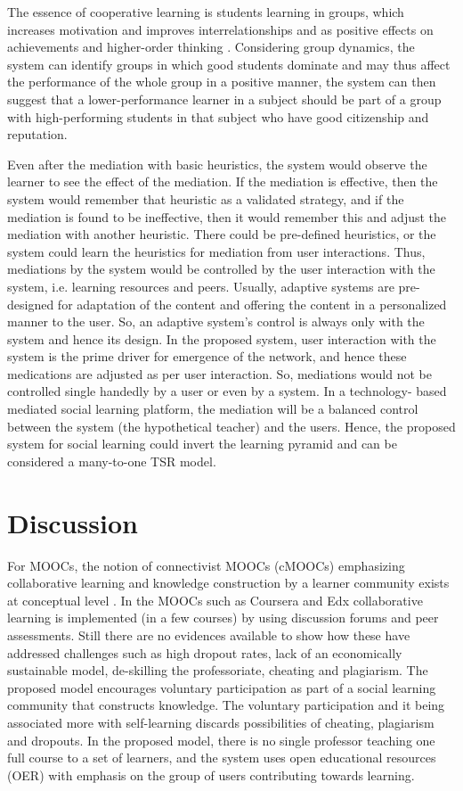 \begin{multicols}{2}
The essence of cooperative learning is students learning in groups, which increases motivation and improves interrelationships and as positive effects on achievements and higher-order thinking \cite{art2-key13}. Considering group dynamics, the system can identify groups in which good students dominate and may thus affect the performance of the whole group in a positive manner, the system can then suggest that a lower-performance learner in a subject should be part of a group with high-performing students in that subject who have good citizenship and reputation.

Even after the mediation with basic heuristics, the system would observe the learner to see the effect of the mediation. If the mediation is effective, then the system would remember that heuristic as a validated strategy, and if the mediation is found to be ineffective, then it would remember this and adjust the mediation with another heuristic. There could be pre-defined heuristics, or the system could learn the heuristics for mediation from user interactions. Thus, mediations by the system would be controlled by the user interaction with the system, i.e. learning resources and peers. Usually, adaptive systems are pre-designed for adaptation of the content and offering the content in a personalized manner to the user. So, an adaptive system’s control is always only with  the system and hence its design. In the proposed system, user interaction with the system is the prime driver for emergence of the network, and hence these medications are adjusted as per user interaction. So, mediations would not be controlled single handedly by a user or even by a system. In a technology- based mediated social learning platform, the mediation will be a balanced control between the system (the hypothetical teacher) and the users. Hence, the proposed system for social learning could invert the learning pyramid and can be considered a many-to-one TSR model.

\vfill\eject

\section{Discussion}

For MOOCs, the notion of connectivist MOOCs (cMOOCs) emphasizing collaborative learning and knowledge construction by a learner community exists at conceptual level \cite{art2-key56}. In the MOOCs such as Coursera and Edx collaborative learning is implemented (in a few courses) by using discussion forums and peer assessments. Still there are no evidences available to show how these have addressed challenges such as high dropout rates, lack of an economically sustainable model, de-skilling the professoriate, cheating and plagiarism. The proposed model encourages voluntary participation as part of a social learning community that constructs knowledge. The voluntary participation and it being associated more with self-learning discards possibilities of cheating, plagiarism and dropouts. In the proposed model, there is no single professor teaching one full course to a set of learners, and the system uses open educational resources (OER) with emphasis on the group of users contributing towards learning.


\end{multicols}
